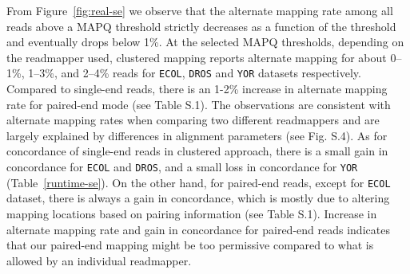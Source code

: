 \documentclass[a4paper]{article}
\begin{document}
From Figure~\ref{fig:real-se} we observe that the alternate mapping rate among all reads above a MAPQ threshold strictly decreases as a function of the threshold and eventually drops below 1\%. 
At the selected MAPQ thresholds, depending on the readmapper used, clustered mapping reports alternate mapping for about 0--1\%, 1--3\%, and 2--4\%  reads for {\tt ECOL}, {\tt DROS} and {\tt YOR} datasets respectively. Compared to single-end reads, there is an 1-2\% increase in alternate mapping rate for paired-end mode (see Table S.1). The observations are consistent with alternate mapping rates when comparing two different readmappers and are largely explained by differences in alignment parameters (see Fig. S.4).
As for concordance of single-end reads in
clustered approach, there is a small gain in concordance  for {\tt ECOL} and {\tt DROS}, and a small loss in concordance for {\tt YOR} (Table~\ref{runtime-se}). On the other hand, for paired-end reads, except for {\tt ECOL} dataset, there is always a gain in concordance, which is mostly due to altering mapping locations based on pairing information (see Table S.1). Increase in alternate mapping rate and gain in concordance for paired-end reads indicates that our paired-end mapping might be too permissive compared to what is allowed by an individual readmapper.
\end{document}
